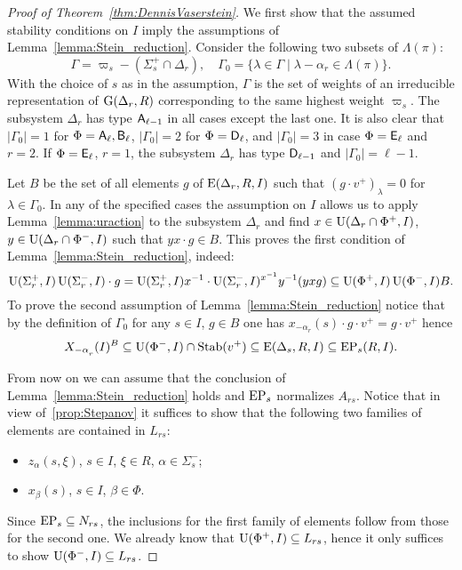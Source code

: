 \begin{proof}[Proof of Theorem~\ref{thm:DennisVaserstein}]
We first show that the assumed stability conditions on $I$ imply the assumptions of Lemma~\ref{lemma:Stein_reduction}.
Consider the following two subsets of $\Lambda(\pi)$:
$$\Gamma = \varpi_s- (\Sigma_s^+\cap \Delta_r),\quad \Gamma_0 = \{\lambda \in \Gamma \mid \lambda - \alpha_r \in \Lambda(\pi) \}.$$
With the choice of $s$ as in the assumption, $\Gamma$ is the set of weights of an irreducible representation of $\operatorname{G}(\Delta_r, R)$ corresponding to the same highest weight $\varpi_s$.
The subsystem $\Delta_r$ has type $\mathsf{A}_{\ell-1}$ in all cases except the last one.
It is also clear that $|\Gamma_0|=1$ for $\Phi=\mathsf{A}_\ell, \mathsf{B}_\ell$, $|\Gamma_0|=2$ for $\Phi=\mathsf{D}_\ell$, and $|\Gamma_0|=3$ in case $\Phi=\mathsf{E}_\ell$ and $r=2$.
If $\Phi=\mathsf{E}_\ell$, $r=1$, the subsystem $\Delta_r$ has type $\mathsf{D}_{\ell-1}$ and $|\Gamma_0|=\ell-1$.

Let $B$ be the set of all elements $g$ of $\operatorname{E}(\Delta_r,R, I)$ such that $(g \cdot v^+)_\lambda = 0$ for $\lambda\in\Gamma_0$.
In any of  the specified cases the assumption on $I$ allows us to apply Lemma~\ref{lemma:uraction} to the subsystem $\Delta_r$ and find
$x\in\operatorname{U}(\Delta_r\cap\Phi^+, I)$, $y\in \operatorname{U}(\Delta_r\cap\Phi^-, I)$ such that $yx\cdot g \in B$.
This proves the first condition of Lemma~\ref{lemma:Stein_reduction}, indeed:
\[ \operatorname{U}(\Sigma^+_r, I) \operatorname{U}(\Sigma^-_r, I) \cdot g = \operatorname{U}(\Sigma^+_r, I) x^{-1} \cdot \operatorname{U}(\Sigma^-_r, I)^{x^{-1}} y^{-1} (yxg) \subseteq \operatorname{U}(\Phi^+, I) \operatorname{U}(\Phi^-, I) B. \]
To prove the second assumption of Lemma~\ref{lemma:Stein_reduction} notice that by the definition of $\Gamma_0$ for any $s\in I$, $ g\in B$ one has $x_{-\alpha_r}(s) \cdot g \cdot v^+ = g \cdot v^+$ hence
\[ X_{-\alpha\ssub{r}}(I)^{B} \subseteq \U(\Phi^-, I) \cap \Stab(v^+) \subseteq \E(\Delta_s, R, I) \subseteq \EP_s(R, I). \]

From now on we can assume that the conclusion of Lemma~\ref{lemma:Stein_reduction} holds and $\operatorname{EP}_s$ normalizes $A_{rs}$.
Notice that in view of~\cref{prop:Stepanov} it suffices to show that the following two families of elements are contained in $L_{rs}$:
\begin{itemize} \item $z_{\alpha}(s, \xi)$, $s\in I$, $\xi \in R$, $\alpha\in\Sigma^-_s$;
\item $x_{\beta}(s)$, $s \in I$, $\beta \in \Phi$. \end{itemize}
Since $\operatorname{EP}_s \subseteq N_{rs}$, the inclusions for the first family of elements follow from those for the second one.
We already know that $\operatorname{U}(\Phi^+, I) \subseteq L_{rs}$, hence it only suffices to show $\operatorname{U}(\Phi^-, I) \subseteq L_{rs}$.


\end{proof}
